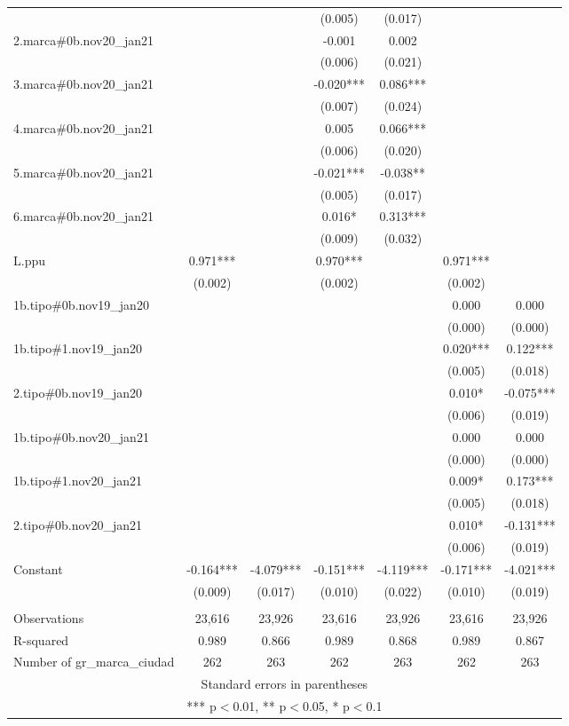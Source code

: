 \begin{tabular}{lcccccc}
 &  &  & (0.005) & (0.017) &  &  \\
2.marca\#0b.nov20\_jan21 &  &  & -0.001 & 0.002 &  &  \\
 &  &  & (0.006) & (0.021) &  &  \\
3.marca\#0b.nov20\_jan21 &  &  & -0.020*** & 0.086*** &  &  \\
 &  &  & (0.007) & (0.024) &  &  \\
4.marca\#0b.nov20\_jan21 &  &  & 0.005 & 0.066*** &  &  \\
 &  &  & (0.006) & (0.020) &  &  \\
5.marca\#0b.nov20\_jan21 &  &  & -0.021*** & -0.038** &  &  \\
 &  &  & (0.005) & (0.017) &  &  \\
6.marca\#0b.nov20\_jan21 &  &  & 0.016* & 0.313*** &  &  \\
 &  &  & (0.009) & (0.032) &  &  \\
L.ppu & 0.971*** &  & 0.970*** &  & 0.971*** &  \\
 & (0.002) &  & (0.002) &  & (0.002) &  \\
1b.tipo\#0b.nov19\_jan20 &  &  &  &  & 0.000 & 0.000 \\
 &  &  &  &  & (0.000) & (0.000) \\
1b.tipo\#1.nov19\_jan20 &  &  &  &  & 0.020*** & 0.122*** \\
 &  &  &  &  & (0.005) & (0.018) \\
2.tipo\#0b.nov19\_jan20 &  &  &  &  & 0.010* & -0.075*** \\
 &  &  &  &  & (0.006) & (0.019) \\
1b.tipo\#0b.nov20\_jan21 &  &  &  &  & 0.000 & 0.000 \\
 &  &  &  &  & (0.000) & (0.000) \\
1b.tipo\#1.nov20\_jan21 &  &  &  &  & 0.009* & 0.173*** \\
 &  &  &  &  & (0.005) & (0.018) \\
2.tipo\#0b.nov20\_jan21 &  &  &  &  & 0.010* & -0.131*** \\
 &  &  &  &  & (0.006) & (0.019) \\
Constant & -0.164*** & -4.079*** & -0.151*** & -4.119*** & -0.171*** & -4.021*** \\
 & (0.009) & (0.017) & (0.010) & (0.022) & (0.010) & (0.019) \\
 &  &  &  &  &  &  \\
Observations & 23,616 & 23,926 & 23,616 & 23,926 & 23,616 & 23,926 \\
R-squared & 0.989 & 0.866 & 0.989 & 0.868 & 0.989 & 0.867 \\
 Number of gr\_marca\_ciudad & 262 & 263 & 262 & 263 & 262 & 263 \\ \hline
\multicolumn{7}{c}{ Standard errors in parentheses} \\
\multicolumn{7}{c}{ *** p$<$0.01, ** p$<$0.05, * p$<$0.1} \\
\end{tabular}
